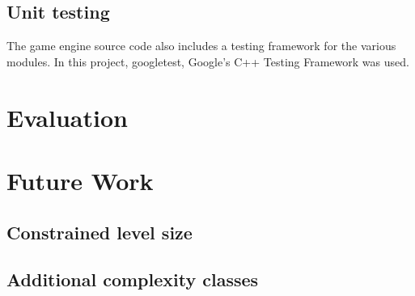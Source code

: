 \documentclass[11pt, a4paper, oneside]{report} %
\begin{document}
\section{Unit testing}

The game engine source code also includes a testing framework for the various
modules. In this project, googletest, Google's C++ Testing Framework was used.


\chapter{Evaluation}






\chapter{Future Work}

\section{Constrained level size}


\section{Additional complexity classes}
\end{document}
